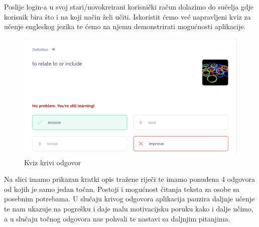 Poslije login-a u svoj stari/novokreirani korisnički račun dolazimo do sučelja gdje korisnik bira što i na koji način želi učiti. Iskoristit ćemo već napravljeni kviz za učenje engleskog jezika te ćemo na njemu demonstrirati mogućnosti aplikacije. 

\begin{figure}[H]
	\includegraphics[width=\textwidth]{SlikeOpisProjekta/english_quiz_wrong_answer_quizlet.png} %
	\caption{Kviz krivi odgovor}
	\label{fig:EnglishQuizWrongAnswerQuizlet} %
\end{figure}

Na slici imamo prikazan kratki opis tražene riječi te imamo ponuđena 4 odgovora od kojih je samo jedan točan. Postoji i mogućnost čitanja teksta za osobe sa posebnim potrebama.
U slučaju krivog odgovora aplikacija pauzira daljnje učenje te nam ukazuje na pogrešku i daje malu motivacijsku poruku kako i dalje učimo, a u slučaju točnog odgovora nas pohvali te nastavi sa daljnjim pitanjima.

		\eject
		
		